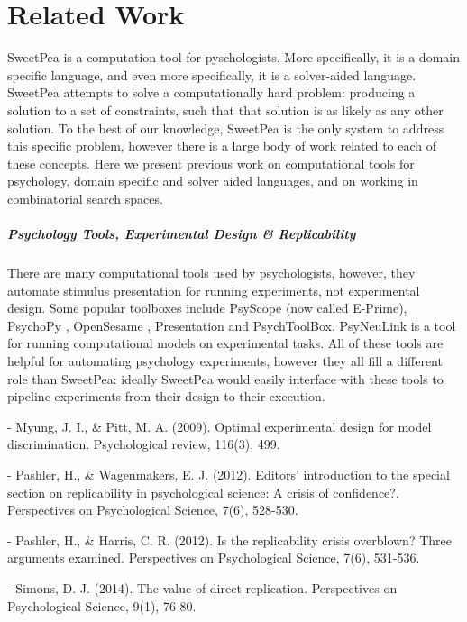 

\chapter{Related Work}

SweetPea is a computation tool for pyschologists. More specifically, it is a domain specific language, and even more specifically, it is a solver-aided language. SweetPea attempts to solve a computationally hard problem: producing a solution to a set of constraints, such that that solution is as likely as any other solution. To the best of our knowledge, SweetPea is the only system to address this specific problem, however there is a large body of work related to each of these concepts. Here we present previous work on computational tools for psychology, domain specific and solver aided languages, and on working in combinatorial search spaces.

\paragraph*{Psychology Tools, Experimental Design \& Replicability}

There are many computational tools used by psychologists, however, they automate stimulus presentation for running experiments, not experimental design. Some popular toolboxes include PsyScope \cite{cohen1993psyscope} (now called E-Prime), PsychoPy \cite{mathot2012opensesame}, OpenSesame \cite{peirce2009generating}, Presentation and PsychToolBox. PsyNeuLink is a tool for running computational models on experimental tasks. All of these tools are helpful for automating psychology experiments, however they all fill a different role than SweetPea: ideally SweetPea would easily interface with these tools to pipeline experiments from their design to their execution.

- Myung, J. I., \& Pitt, M. A. (2009). Optimal experimental design for model discrimination. Psychological review, 116(3), 499.

- Pashler, H., \& Wagenmakers, E. J. (2012). Editors’ introduction to the special section on replicability in psychological science: A crisis of confidence?. Perspectives on Psychological Science, 7(6), 528-530.

- Pashler, H., \& Harris, C. R. (2012). Is the replicability crisis overblown? Three arguments examined. Perspectives on Psychological Science, 7(6), 531-536.

- Simons, D. J. (2014). The value of direct replication. Perspectives on Psychological Science, 9(1), 76-80.

